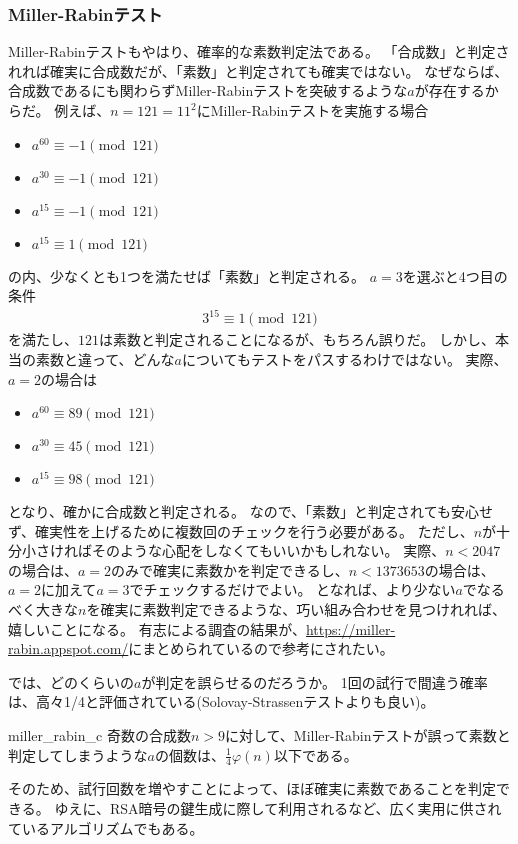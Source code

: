 \subsubsection{Miller-Rabinテスト}
Miller-Rabinテストもやはり、確率的な素数判定法である。
「合成数」と判定されれば確実に合成数だが、「素数」と判定されても確実ではない。
なぜならば、合成数であるにも関わらずMiller-Rabinテストを突破するような$a$が存在するからだ。
例えば、$n=121=11^2$にMiller-Rabinテストを実施する場合
\begin{itemize}
\item $a^{60} \equiv -1 \pmod{121}$
\item $a^{30} \equiv -1 \pmod{121}$
\item $a^{15} \equiv -1 \pmod{121}$
\item $a^{15} \equiv 1 \pmod{121}$
\end{itemize}
の内、少なくとも1つを満たせば「素数」と判定される。
$a=3$を選ぶと4つ目の条件
\begin{align*}
3^{15} \equiv 1 \pmod{121}
\end{align*}
を満たし、$121$は素数と判定されることになるが、もちろん誤りだ。
しかし、本当の素数と違って、どんな$a$についてもテストをパスするわけではない。
実際、$a=2$の場合は
\begin{itemize}
\item $a^{60} \equiv 89 \pmod{121}$
\item $a^{30} \equiv 45 \pmod{121}$
\item $a^{15} \equiv 98 \pmod{121}$
\end{itemize}
となり、確かに合成数と判定される。
なので、「素数」と判定されても安心せず、確実性を上げるために複数回のチェックを行う必要がある。
ただし、$n$が十分小さければそのような心配をしなくてもいいかもしれない。
実際、$n<2047$の場合は、$a=2$のみで確実に素数かを判定できるし、$n<1373653$の場合は、$a=2$に加えて$a=3$でチェックするだけでよい。
となれば、より少ない$a$でなるべく大きな$n$を確実に素数判定できるような、巧い組み合わせを見つけれれば、嬉しいことになる。
有志による調査の結果が、\url{https://miller-rabin.appspot.com/}にまとめられているので参考にされたい。



では、どのくらいの$a$が判定を誤らせるのだろうか。
1回の試行で間違う確率は、高々1/4と評価されている(Solovay-Strassenテストよりも良い)。

\begin{Prop}{}{miller_rabin_c}
奇数の合成数$n>9$に対して、Miller-Rabinテストが誤って素数と判定してしまうような$a$の個数は、$\frac{1}{4}\varphi(n)$以下である。
\end{Prop}

そのため、試行回数を増やすことによって、ほぼ確実に素数であることを判定できる。
ゆえに、RSA暗号の鍵生成に際して利用されるなど、広く実用に供されているアルゴリズムでもある。

